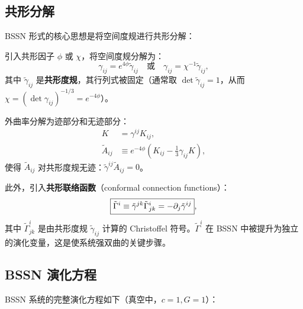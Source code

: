 \subsection{共形分解}

BSSN 形式的核心思想是将空间度规进行共形分解：

\begin{definition}[BSSN 变数]
引入共形因子 $\phi$ 或 $\chi$，将空间度规分解为：
\begin{equation}
    \boxed{\gamma_{ij} = e^{4\phi} \tilde{\gamma}_{ij} \quad\text{或}\quad \gamma_{ij} = \chi^{-1}\tilde{\gamma}_{ij}},
    \label{eq:conformal_decomp}
\end{equation}
其中 $\tilde{\gamma}_{ij}$ 是\textbf{共形度规}，其行列式被固定（通常取 $\det\tilde{\gamma}_{ij} = 1$，从而 $\chi = (\det\gamma_{ij})^{-1/3} = e^{-4\phi}$）。

外曲率分解为迹部分和无迹部分：
\begin{align}
    K &= \gamma^{ij}K_{ij}, \label{eq:trace_K} \\
    \tilde{A}_{ij} &\equiv e^{-4\phi}\left(K_{ij} - \frac{1}{3}\gamma_{ij}K\right),
    \label{eq:Atilde_def}
\end{align}
使得 $\tilde{A}_{ij}$ 对共形度规无迹：$\tilde{\gamma}^{ij}\tilde{A}_{ij} = 0$。
\label{def:BSSN_variables}
\end{definition}

此外，引入\textbf{共形联络函数}（conformal connection functions）：
\begin{equation}
    \boxed{\tilde{\Gamma}^i \equiv \tilde{\gamma}^{jk}\tilde{\Gamma}^i_{jk} = -\partial_j \tilde{\gamma}^{ij}},
    \label{eq:Gamma_conformal}
\end{equation}
其中 $\tilde{\Gamma}^i_{jk}$ 是由共形度规 $\tilde{\gamma}_{ij}$ 计算的 Christoffel 符号。$\tilde{\Gamma}^i$ 在 BSSN 中被提升为独立的演化变量，这是使系统强双曲的关键步骤。

\subsection{BSSN 演化方程}

BSSN 系统的完整演化方程如下（真空中，$c=1, G=1$）：

